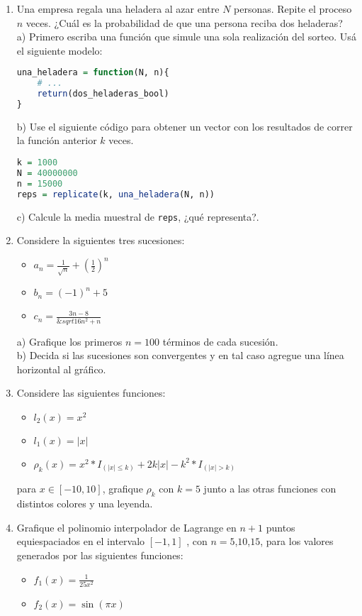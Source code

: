 \documentclass{article}
\begin{document}
\begin{enumerate}
\item Una empresa regala una heladera al azar entre $N$ personas. Repite el proceso $n$ veces. ¿Cuál es la probabilidad de que una persona reciba dos heladeras? \\
a) Primero escriba una función que simule una sola realización del sorteo. Usá el siguiente modelo:

\begin{lstlisting}[language=R]
una_heladera = function(N, n){
    # ...
    return(dos_heladeras_bool)
}
\end{lstlisting}

b) Use el siguiente código para obtener un vector con los resultados de correr la función anterior $k$ veces.

\begin{lstlisting}[language=R]
k = 1000
N = 40000000
n = 15000
reps = replicate(k, una_heladera(N, n))
\end{lstlisting}

c) Calcule la media muestral de \texttt{reps}, ¿qué representa?.

\item Considere la siguientes tres sucesiones:
\begin{itemize}
\item $a_n = \frac{1}{\sqrt{n}} + (\frac{1}{2})^n$
\item $b_n=(-1)^n + 5$
\item $c_n = \frac{3n-8}{\&sqrt{16n^2+n}}$
\end{itemize}

a) Grafique los primeros $n=100$ términos de cada sucesión. \\
b) Decida si las sucesiones son convergentes y en tal caso agregue una línea horizontal al gráfico.

\item Considere las siguientes funciones:
\begin{itemize}
\item $l_2(x) = x^2$
\item $l_1(x) = |x|$
\item $\rho _k(x) = x^2 * I_{(|x| \leq k)} + 2k|x| - k^2 * I_{(|x| > k)}$
\end{itemize}

para $x \in \left[-10,10 \right]$, grafique $\rho _k$ con $k=5$ junto a las otras funciones con distintos colores y una leyenda.

 \item Grafique el polinomio interpolador de Lagrange en $n+1$ puntos equiespaciados en el intervalo $\left[-1,1 \right]$ , con $n=5$,$10$,$15$, para los valores generados por las siguientes funciones:

\begin{itemize}
\item $f_1(x) = \frac{1}{25x^2}$
\item $f_2(x) = \sin (\pi x)$
\end{itemize}

\end{enumerate}
\end{document}
